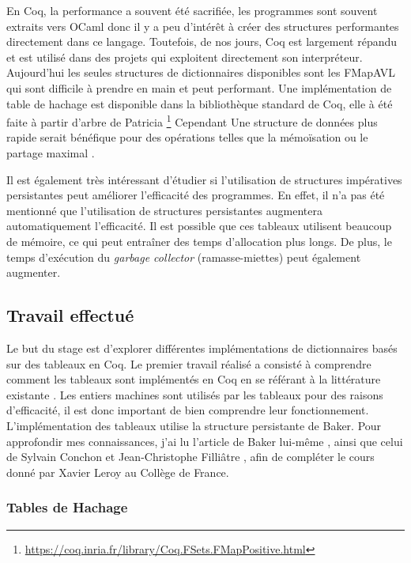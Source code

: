 \documentclass{article}
\begin{document}
  En Coq, la performance a souvent été sacrifiée, les programmes sont souvent
extraits vers OCaml donc il y a peu d'intérêt à créer des structures performantes
directement dans ce langage. Toutefois, de nos jours, Coq est largement répandu
et est utilisé dans des projets qui exploitent directement son interpréteur.
Aujourd'hui les seules structures de dictionnaires disponibles sont les
FMapAVL qui sont difficile à prendre en main et peut performant. Une
implémentation de table de hachage est disponible dans la bibliothèque standard
de Coq, elle à été faite à partir d'arbre de Patricia
\footnote{\url{https://coq.inria.fr/library/Coq.FSets.FMapPositive.html}}
Cependant Une structure de données plus rapide serait bénéfique pour des
opérations telles que la mémoïsation ou le partage maximal
\cite{braibant2014implementing}.

  Il est également très intéressant d'étudier si l'utilisation de structures
impératives persistantes peut améliorer l'efficacité des programmes. En effet,
il n'a pas été mentionné que l'utilisation de structures persistantes augmentera
automatiquement l'efficacité. Il est possible que ces tableaux utilisent
beaucoup de mémoire, ce qui peut entraîner des temps d'allocation plus longs.
De plus, le temps d'exécution du \textit{garbage collector} (ramasse-miettes)
peut également augmenter.

    \newpage
    \subsection{Travail effectué}

Le but du stage est d'explorer différentes implémentations de dictionnaires
basés sur des tableaux en Coq. Le premier travail réalisé a consisté à
comprendre comment les tableaux sont implémentés en Coq en se référant à la
littérature existante \cite{armand2010extending}. Les entiers machines sont
utilisés par les tableaux pour des raisons d'efficacité, il est donc important
de bien comprendre leur fonctionnement. L'implémentation des tableaux utilise
la structure persistante de Baker. Pour approfondir mes connaissances, j'ai lu
l'article de Baker lui-même \cite{baker1991shallow}, ainsi que celui de
Sylvain Conchon et Jean-Christophe Filliâtre \cite{conchon2007persistent}, afin
de compléter le cours donné par Xavier Leroy au Collège de France.

    \subsubsection{Tables de Hachage}
\end{document}
